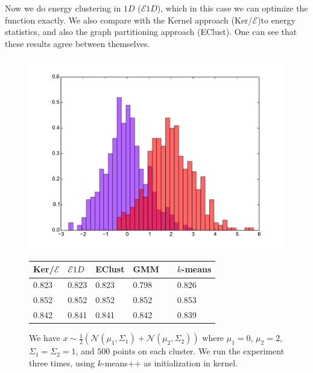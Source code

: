 \documentclass[aps,preprint,nofootinbib,floatfix]{revtex4-1}
\begin{document}
Now we do energy clustering in $1D$ ($\mathcal{E}1D$), 
which in this case we can optimize
the function exactly. We also compare with the Kernel approach 
(Ker/$\mathcal{E}$)to energy
statistics, and also the graph partitioning approach (EClust). One can see that
these results agree between themselves.

\begin{figure}[h]
\begin{minipage}{.49\textwidth}
\includegraphics[scale=.45]{hist_gauss1.pdf}
\end{minipage}
\begin{minipage}{.49\textwidth}
\begin{tabular}{ l l l l l}
\hline
Ker/$\mathcal{E}$ & $\mathcal{E} 1D$ & EClust & GMM~~ & $k$-means \\
\hline
0.823 &
0.823 &
0.823 &
0.798 &
0.826 \\
0.852 & 
0.852 &
0.852 &
0.852 & 
0.853 \\
0.842 &
0.841 &
0.841 & 
0.842 &
0.839 \\
\hline
\end{tabular}
\end{minipage}
\caption{\label{fig:1dgaus1}
We have $x \sim \tfrac{1}{2}\left( \mathcal{N}(\mu_1, \Sigma_1) +
\mathcal{N}(\mu_2, \Sigma_2)\right)$ where $\mu_1 = 0$, $\mu_2=2$,
$\Sigma_1 = \Sigma_2 = 1$,
and $500$ points on each cluster. We run the experiment three times,
using $k$-means++ as initialization in kernel.
}
\end{figure}
\end{document}
